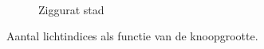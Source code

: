 \begin{figure}[t]
\begin{minipage}[t]{0.5\textwidth}
\begin{adjustbox}{minipage=\textwidth, scale=0.55}
  \end{adjustbox} \\
  \begin{adjustbox}{minipage=\textwidth, scale=0.55}
    \begin{subfigure}[b]{1.6\textwidth}
      \centering
      \def\svgwidth{\textwidth}
      
      \caption{Ziggurat stad}
      \label{fig:hs-ns-light-indices:city}
    \end{subfigure}
  \end{adjustbox}
  \caption{\small Aantal lichtindices als functie van de knoopgrootte.}
  \label{fig:hs-ns-light-indices}
  \end{minipage} 
\end{figure}


